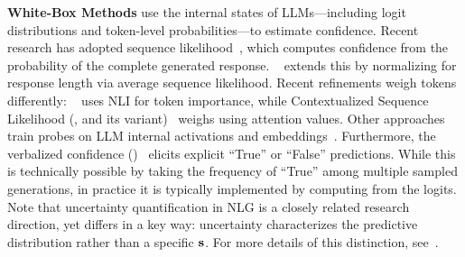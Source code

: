 

\textbf{White-Box Methods} use the internal states of LLMs—including logit distributions and token-level probabilities—to estimate confidence. 
Recent research has adopted sequence likelihood~\cite{CSL}, which computes confidence from the probability of the complete generated response.
\baselineNLLNorm~\cite{vashurin2024benchmarking} extends this by normalizing for response length via average sequence likelihood. 
Recent refinements weigh tokens differently: \baselineSAR~\cite{duan-etal-2024-shifting} uses NLI for token importance, while Contextualized Sequence Likelihood (\baselineCSL, and its variant\baselineCSLNext)~\cite{CSL} weighs using attention values. 
Other approaches train probes on LLM internal activations and embeddings~\cite{ren2023outofdistribution,azaria-mitchell-2023-internal,li2023inferencetime}. 
Furthermore, the verbalized confidence (\baselinePTrue)~\cite{xiong2024can} elicits explicit ``True'' or ``False'' predictions. 
While this is technically possible by taking the frequency of ``True'' among multiple sampled generations, in practice it is typically implemented by computing from the logits. Note that uncertainty quantification in NLG is a closely related research direction, yet differs in a key way: uncertainty characterizes the predictive distribution rather than a specific $\mathbf{s}$. For more details of this distinction, see~\citet{lin2024generating}.


